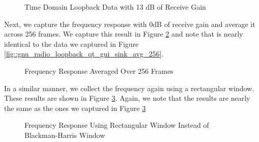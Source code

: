 \documentclass{article}
\begin{document}
\begin{figure}[H]
	\centerline{}
	\caption{Time Domain Loopback Data with 13 dB of Receive Gain}
	\label{fig::gnu_radio_loopback_generic_iio_rx_gain_13dB}
\end{figure}

Next, we capture the frequency response with 0dB of receive gain and average it across 256 frames. We capture this result in Figure \ref{fig::gnu_radio_loopback_generic_iio_avg_256} and note that is nearly identical to the data we captured in Figure \ref{fig::gnu_radio_loopback_qt_gui_sink_avg_256}.

\begin{figure}[H]
	\centerline{}
	\caption{Frequency Response Averaged Over 256 Frames}
	\label{fig::gnu_radio_loopback_generic_iio_avg_256}
\end{figure}

In a similar manner, we collect the frequency again using a rectangular window. These results are shown in Figure \ref{fig::gnu_radio_loopback_generic_iio_rect_win}. Again, we note that the results are nearly the same as the ones we captured in Figure \ref{fig::gnu_radio_loopback_generic_iio_rect_win}

\begin{figure}[H]
	\centerline{}
	\caption{Frequency Response Using Rectangular Window Instead of Blackman-Harris Window}
	\label{fig::gnu_radio_loopback_generic_iio_rect_win}
\end{figure}
\end{document}
